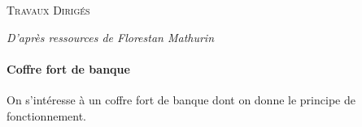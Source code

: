\documentclass[10pt]{article}
\begin{document}

\begin{center}
\large{\textsc{Travaux Dirigés}}
\end{center}

\vspace{.5cm}
\begin{flushright}
\textit{D'après ressources de Florestan Mathurin}
\end{flushright}



\paragraph*{Coffre fort de banque}

\setcounter{subparagraph}{0}


On s'intéresse à un coffre fort de banque dont on donne le principe de fonctionnement.

\vspace{.25cm} 
\end{document}
